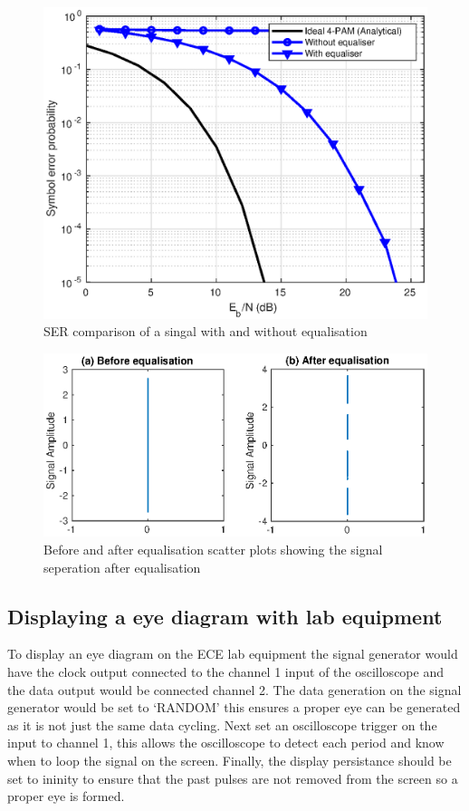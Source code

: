 \begin{figure}[H]
    \begin{center}
        \includegraphics{Equaliser/ber}
    \end{center}
    \caption{SER comparison of a singal with and without equalisation}
    \label{fig:equ-ser}
\end{figure}

\begin{figure}[H]
    \begin{center}
        \includegraphics{Equaliser/scatter}
    \end{center}
    \caption{Before and after equalisation scatter plots showing the signal seperation after equalisation}
    \label{fig:equ-scatter}
\end{figure}

\subsection{Displaying a eye diagram with lab equipment}
To display an eye diagram on the ECE lab equipment the signal generator would have the clock output connected to the channel 1
input of the oscilloscope and the data output would be connected channel 2. The data generation on the signal generator would
be set to `RANDOM' this ensures a proper eye can be generated as it is not just the same data cycling. Next set an oscilloscope
trigger on the input to channel 1, this allows the oscilloscope to detect each period and know when to loop the signal on the screen.
Finally, the display persistance should be set to ininity to ensure that the past pulses are not removed from the screen so a proper
eye is formed.